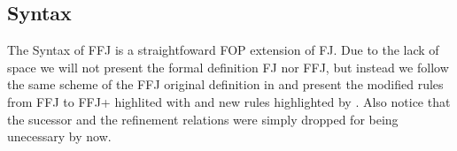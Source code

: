 
\subsection{Syntax}
The Syntax of \ac{FFJ} is a straightfoward \ac{FOP} extension of \ac{FJ}. Due to the lack
of space we will not present the formal definition \ac{FJ} nor \ac{FFJ}, but instead we follow
the same scheme of the \ac{FFJ} original definition in \cite{apel_feature_2008} and present
the modified rules from \ac{FFJ} to \ac{FFJ+} highlited with  
and new rules highlighted by . Also notice that the sucessor and 
the refinement relations were simply dropped for being unecessary by now.

